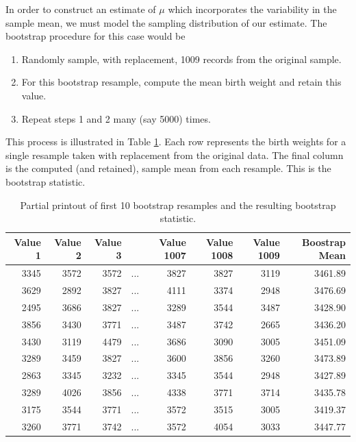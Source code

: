 \documentclass[
]{book}
\providecommand{\tightlist}{%
  \setlength{\itemsep}{0pt}\setlength{\parskip}{0pt}}
\theoremstyle{plain}
\theoremstyle{mydefn}
\theoremstyle{myexmpl}
\theoremstyle{remark}
\begin{document}
In order to construct an estimate of \(\mu\) which incorporates the variability in the sample mean, we must model the sampling distribution of our estimate. The bootstrap procedure for this case would be

\begin{enumerate}
\def\labelenumi{\arabic{enumi}.}
\tightlist
\item
  Randomly sample, with replacement, 1009 records from the original sample.
\item
  For this bootstrap resample, compute the mean birth weight and retain this value.
\item
  Repeat steps 1 and 2 many (say 5000) times.
\end{enumerate}

This process is illustrated in Table \ref{tab:singleconfint-bootstrap}. Each row represents the birth weights for a single resample taken with replacement from the original data. The final column is the computed (and retained), sample mean from each resample. This is the bootstrap statistic.

\begin{table}

\caption{\label{tab:singleconfint-bootstrap}Partial printout of first 10 bootstrap resamples and the resulting bootstrap statistic.}
\centering
\begin{tabular}[t]{r|r|r|l|r|r|r|r}
\hline
Value 1 & Value 2 & Value 3 &         & Value 1007 & Value 1008 & Value 1009 & Boostrap Mean\\
\hline
3345 & 3572 & 3572 & ... & 3827 & 3827 & 3119 & 3461.89\\
\hline
3629 & 2892 & 3827 & ... & 4111 & 3374 & 2948 & 3476.69\\
\hline
2495 & 3686 & 3827 & ... & 3289 & 3544 & 3487 & 3428.90\\
\hline
3856 & 3430 & 3771 & ... & 3487 & 3742 & 2665 & 3436.20\\
\hline
3430 & 3119 & 4479 & ... & 3686 & 3090 & 3005 & 3451.09\\
\hline
3289 & 3459 & 3827 & ... & 3600 & 3856 & 3260 & 3473.89\\
\hline
2863 & 3345 & 3232 & ... & 3345 & 3544 & 2948 & 3427.89\\
\hline
3289 & 4026 & 3856 & ... & 4338 & 3771 & 3714 & 3435.78\\
\hline
3175 & 3544 & 3771 & ... & 3572 & 3515 & 3005 & 3419.37\\
\hline
3260 & 3771 & 3742 & ... & 3572 & 4054 & 3033 & 3447.77\\
\hline
\end{tabular}
\end{table}
\end{document}
